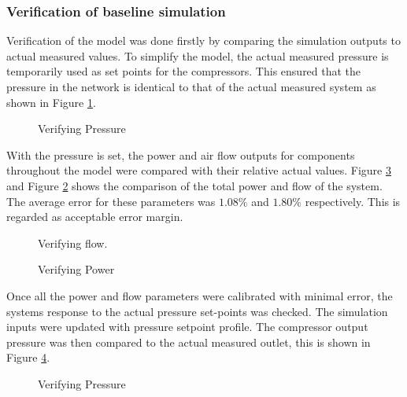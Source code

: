 	\subsubsection{Verification of baseline simulation}
	Verification of the model was done firstly by comparing the simulation outputs to actual measured values. To simplify the model, the actual measured pressure is temporarily used as set points for the compressors. This ensured that the pressure in the network is identical to that of the actual measured system as shown in Figure \ref{fig: Verification Pressure kusasalethu}.
	\par 
	
	\begin{figure}[h]
		\centering
		\fbox{}
		\caption{Verifying Pressure}
		\label{fig: Verification Pressure kusasalethu}
	\end{figure}

 	With the pressure is set, the power and air flow outputs for components throughout the model were compared with their relative actual values. Figure \ref{fig: Verification Power kusasalethu} and Figure \ref{fig: Verification flow kusasalethu} shows the comparison of the total power and flow of the system. The average error for these parameters was $1.08 \%$ and $1.80 \%$ respectively. This is regarded as acceptable error margin. 
 
	\begin{figure}[h]
		\centering
		\fbox{}
		\caption{Verifying flow.}
		\label{fig: Verification flow kusasalethu}
	\end{figure}
	\begin{figure}[h]
		\centering
		\fbox{}
		\caption{Verifying Power}
		\label{fig: Verification Power kusasalethu}
	\end{figure}
	Once all the power and flow parameters were calibrated with minimal error, the systems response to the actual pressure set-points was checked. The simulation inputs were updated with pressure setpoint profile. The compressor output pressure was then compared to the actual measured outlet, this is shown in Figure \ref{fig: Verification Pressure kusasalethu Setpoint}.
	
	\begin{figure}[h]
		\centering
		\fbox{}
		\caption{Verifying Pressure}
		\label{fig: Verification Pressure kusasalethu Setpoint}
	\end{figure}
	
